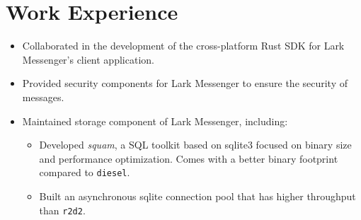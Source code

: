 \documentclass{resume}
\newcommand{\en}[1]{#1}
\newcommand{\zh}[1]{}
\begin{document}
\section{\en{Work Experience}\zh{工作经历}}
\en{}
\zh{\datedsubsection{\textbf{\href{https://www.bytedance.com/}{字节跳动}}}{09/2021 -- 至今}}
\en{}
\zh{\role{飞书跨平台基础架构}{Rust 研发实习}}
\begin{itemize}
      \item \en{
                Collaborated in the development of the cross-platform Rust SDK for Lark Messenger's client application.
            }
            \zh{协作开发飞书客户端跨平台 Rust SDK。}
      \item \en{
                Provided security components for Lark Messenger to ensure the security of messages.
                }
            \zh{
                为飞书消息业务提供安全组件，确保消息的安全性。
            }
      \item \en{
                Maintained storage component of Lark Messenger, including:
            }
            \zh{
                维护飞书 SDK 的存储组件，包括：
            }
      \begin{itemize}
                  \item \en{
                              Developed \textit{squam}, a SQL toolkit based on sqlite3 focused on binary size and performance optimization.
                              Comes with a better binary footprint compared to \texttt{diesel}.
                        }
                        \zh{
                              开发了基于 sqlite3 的 SQL 工具库 \textit{squam}，专注于优化二进制大小和性能。在测试中，相较于 \texttt{diesel}，\textit{squam} 的二进制体积更小，编译时间更短。
                        }
                  \item \en{
                              Built an asynchronous sqlite connection pool that has higher throughput than \texttt{r2d2}.
}
\end{itemize}
\end{itemize}
\end{document}

